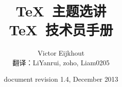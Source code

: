 \documentclass{book}
\begin{document}
\title{\TeX\ 主题选讲\\ {\normalsize \TeX\ 技术员手册}}
\date{document revision 1.4, December 2013}
\author{Victor Eijkhout \\ 翻译：LiYanrui, zoho, Liam0205}
\maketitle

\thispagestyle{empty}
\hbox{}\vfill\hbox{}\pagebreak
\setcounter{page}{1}
\end{document}
